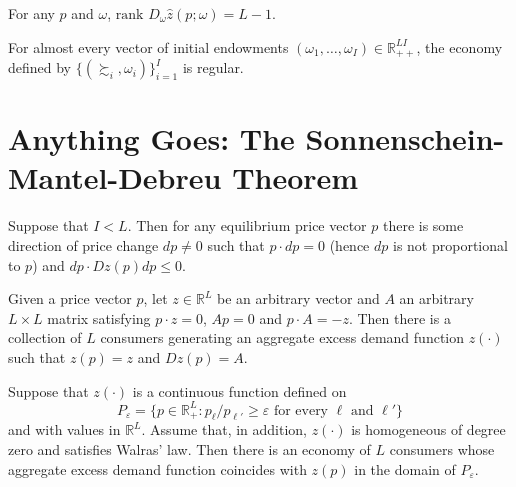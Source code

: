 \begin{prop}
    For any $p$ and $\omega$, $\text{rank } D_\omega \hat{z}(p; \omega) = L - 1$.
\end{prop}

\begin{prop}
    For almost every vector of initial endowments $(\omega_1, \dots, \omega_I) \in \mathbb{R}^{LI}_{++}$, the economy defined by $\{(\succsim_i, \omega_i)\}_{i = 1}^I$ is regular.
\end{prop}


\section{Anything Goes: The Sonnenschein-Mantel-Debreu Theorem}

\begin{prop}
    Suppose that $I < L$. Then for any equilibrium price vector $p$ there is some direction of price change $dp \neq 0$ such that $p \cdot dp = 0$ (hence $dp$ is not proportional to $p$) and $dp \cdot Dz(p) dp \leq 0$.
\end{prop}

\begin{prop}
    Given a price vector $p$, let $z \in \mathbb{R}^L$ be an arbitrary vector and $A$ an arbitrary $L \times L$ matrix satisfying $p \cdot z = 0$, $Ap = 0$ and $p \cdot A = -z$. Then there is a collection of $L$ consumers generating an aggregate excess demand function $z(\cdot)$ such that $z(p) = z$ and $Dz(p) = A$.
\end{prop}

\begin{prop}
    Suppose that $z(\cdot)$ is a continuous function defined on
    \begin{equation*}
        P_\varepsilon = \{p \in \mathbb{R}^L_+ : p_\ell / p_{\ell'} \geq \varepsilon \text{ for every } \ell \text{ and } \ell'\}
    \end{equation*}
    and with values in $\mathbb{R}^L$. Assume that, in addition, $z(\cdot)$ is homogeneous of degree zero and satisfies Walras' law. Then there is an economy of $L$ consumers whose aggregate excess demand function coincides with $z(p)$ in the domain of $P_\varepsilon$.
\end{prop}

